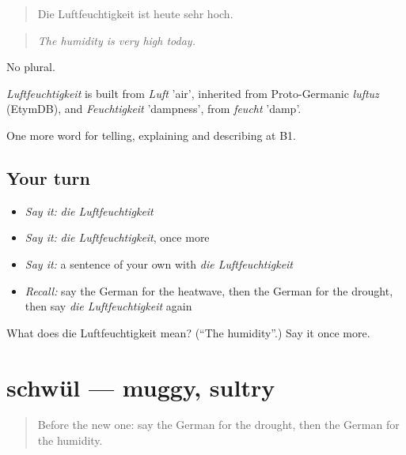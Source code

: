 \begin{quote}
Die Luftfeuchtigkeit ist heute sehr hoch.
\end{quote}

\begin{quote}
\emph{The humidity is very high today.}
\end{quote}

No plural.

\begin{cousinweb}
\emph{Luftfeuchtigkeit} is built from \emph{Luft} 'air', inherited from Proto-Germanic \emph{luftuz} (EtymDB), and \emph{Feuchtigkeit} 'dampness', from \emph{feucht} 'damp'.
\end{cousinweb}

\begin{grammarlens}[title={What you've built}]
One more word for telling, explaining and describing at B1.
\end{grammarlens}

\subsection*{Your turn}
\begin{itemize}
\raggedright
  \item \emph{Say it:} \emph{die Luftfeuchtigkeit}
  \item \emph{Say it:} \emph{die Luftfeuchtigkeit}, once more
  \item \emph{Say it:} a sentence of your own with \emph{die Luftfeuchtigkeit}
  \item \emph{Recall:} say the German for the heatwave, then the German for the drought, then say \emph{die Luftfeuchtigkeit} again
\end{itemize}

\begin{tcolorbox}[breakable,colback=teal!4,colframe=teal!35!black,title={Before you move on}]
What does die Luftfeuchtigkeit mean? (\textquotedblleft{}The humidity\textquotedblright{}.) Say it once more.
\end{tcolorbox}
\section[schwül]{schwül — muggy, sultry}

\label{lesson:GE-C464-schwuel}



\begin{quote}
Before the new one: say the German for the drought, then the German for the humidity.
\end{quote}


